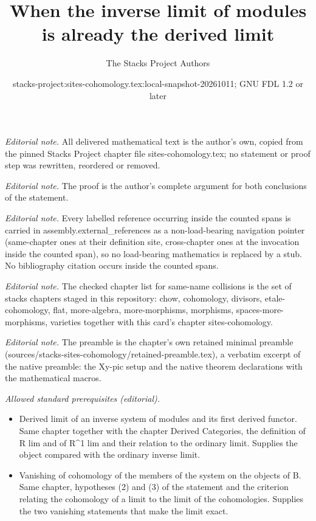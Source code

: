 \documentclass[10pt,a4paper]{amsart}
\title{When the inverse limit of modules is already the derived limit}
\author{The Stacks Project Authors}
\date{stacks-project:sites-cohomology.tex:local-snapshot-20261011; GNU FDL 1.2 or later}
\theoremstyle{plain}
\theoremstyle{definition}
\theoremstyle{remark}
\numberwithin{equation}{subsection}
\begin{document}
\maketitle
\noindent\textit{Editorial note.} All delivered mathematical text is the author's own, copied from the pinned Stacks Project chapter file sites-cohomology.tex; no statement or proof step was rewritten, reordered or removed.\par\medskip
\noindent\textit{Editorial note.} The proof is the author's complete argument for both conclusions of the statement.\par\medskip
\noindent\textit{Editorial note.} Every labelled reference occurring inside the counted spans is carried in assembly.external\_references as a non-load-bearing navigation pointer (same-chapter ones at their definition site, cross-chapter ones at the invocation inside the counted span), so no load-bearing mathematics is replaced by a stub. No bibliography citation occurs inside the counted spans.\par\medskip
\noindent\textit{Editorial note.} The checked chapter list for same-name collisions is the set of stacks chapters staged in this repository: chow, cohomology, divisors, etale-cohomology, flat, more-algebra, more-morphisms, morphisms, spaces-more-morphisms, varieties together with this card's chapter sites-cohomology.\par\medskip
\noindent\textit{Editorial note.} The preamble is the chapter's own retained minimal preamble (sources/stacks-sites-cohomology/retained-preamble.tex), a verbatim excerpt of the native preamble: the Xy-pic setup and the native theorem declarations with the mathematical macros.\par\medskip
\noindent\textit{Allowed standard prerequisites (editorial).}\begin{itemize}
\item Derived limit of an inverse system of modules and its first derived functor. Same chapter together with the chapter Derived Categories, the definition of R lim and of R\textasciicircum{}1 lim and their relation to the ordinary limit. Supplies the object compared with the ordinary inverse limit.
\item Vanishing of cohomology of the members of the system on the objects of B. Same chapter, hypotheses (2) and (3) of the statement and the criterion relating the cohomology of a limit to the limit of the cohomologies. Supplies the two vanishing statements that make the limit exact.
\end{itemize}\medskip
\end{document}
